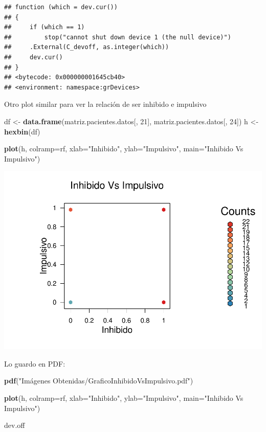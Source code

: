 \documentclass[]{article}
\newenvironment{Shaded}{\begin{snugshade}}{\end{snugshade}}
\newcommand{\DataTypeTok}[1]{\textcolor[rgb]{0.13,0.29,0.53}{#1}}
\newcommand{\DecValTok}[1]{\textcolor[rgb]{0.00,0.00,0.81}{#1}}
\newcommand{\KeywordTok}[1]{\textcolor[rgb]{0.13,0.29,0.53}{\textbf{#1}}}
\newcommand{\NormalTok}[1]{#1}
\newcommand{\StringTok}[1]{\textcolor[rgb]{0.31,0.60,0.02}{#1}}
\begin{document}
\begin{verbatim}
## function (which = dev.cur()) 
## {
##     if (which == 1) 
##         stop("cannot shut down device 1 (the null device)")
##     .External(C_devoff, as.integer(which))
##     dev.cur()
## }
## <bytecode: 0x000000001645cb40>
## <environment: namespace:grDevices>
\end{verbatim}

Otro plot similar para ver la relación de ser inhibido e impulsivo

\begin{Shaded}
\begin{Highlighting}[]
\NormalTok{df <-}\StringTok{ }\KeywordTok{data.frame}\NormalTok{(matriz.pacientes.datos[, }\DecValTok{21}\NormalTok{], matriz.pacientes.datos[, }\DecValTok{24}\NormalTok{])}
\NormalTok{h <-}\StringTok{ }\KeywordTok{hexbin}\NormalTok{(df)}

\KeywordTok{plot}\NormalTok{(h, }\DataTypeTok{colramp=}\NormalTok{rf, }\DataTypeTok{xlab=}\StringTok{"Inhibido"}\NormalTok{, }\DataTypeTok{ylab=}\StringTok{"Impulsivo"}\NormalTok{, }\DataTypeTok{main=}\StringTok{"Inhibido Vs Impulsivo"}\NormalTok{)}
\end{Highlighting}
\end{Shaded}

\includegraphics{codigo_files/figure-latex/grafico_inhibido_impulsivo-1.pdf}

Lo guardo en PDF:

\begin{Shaded}
\begin{Highlighting}[]
\KeywordTok{pdf}\NormalTok{(}\StringTok{"Imágenes Obtenidas/GraficoInhibidoVsImpulsivo.pdf"}\NormalTok{)}

\KeywordTok{plot}\NormalTok{(h, }\DataTypeTok{colramp=}\NormalTok{rf, }\DataTypeTok{xlab=}\StringTok{"Inhibido"}\NormalTok{, }\DataTypeTok{ylab=}\StringTok{"Impulsivo"}\NormalTok{, }\DataTypeTok{main=}\StringTok{"Inhibido Vs Impulsivo"}\NormalTok{)}

\NormalTok{dev.off}
\end{Highlighting}
\end{Shaded}
\end{document}
